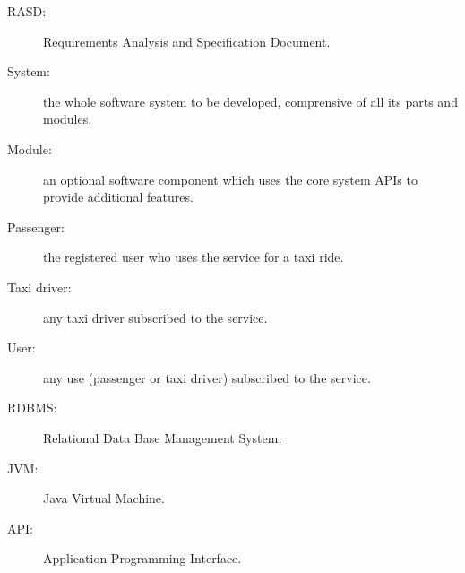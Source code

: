 \begin{description}
\item[RASD:] Requirements Analysis and Specification Document.
\item[System:] the whole software system to be developed, comprensive of all its parts and modules.
\item[Module:] an optional software component which uses the core system APIs to provide additional features.
\item[Passenger:] the registered user who uses the service for a taxi ride.
\item[Taxi driver:] any taxi driver subscribed to the service.
\item[User:] any use (passenger or taxi driver) subscribed to the service.
\item[RDBMS:] Relational Data Base Management System.
\item[JVM:] Java Virtual Machine.
\item[API:] Application Programming Interface.
\end{description}
